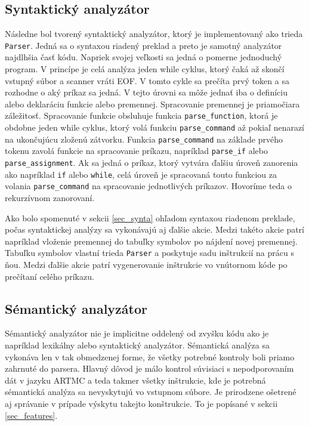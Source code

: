 \subsection{Syntaktický analyzátor}
Následne bol tvorený syntaktický analyzátor, ktorý je implementovaný ako trieda \texttt{Parser}. Jedná sa o syntaxou riadený preklad a preto je samotný analyzátor najdlhšia časť kódu. Napriek svojej veľkosti sa jedná o pomerne jednoduchý program. V princípe je celá analýza jeden while cyklus, ktorý čaká až skončí vstupný súbor a scanner vráti EOF. V tomto cykle sa prečíta prvý token a sa rozhodne o aký príkaz sa jedná. V tejto úrovni sa môže jednať iba o definíciu alebo deklaráciu funkcie alebo premennej. Spracovanie premennej je priamočiara záležitosť. Spracovanie funkcie obsluhuje funkcia \texttt{parse\_function}, ktorá je obdobne jeden while cyklus, ktorý volá funkciu \texttt{parse\_command} až pokiaľ nenarazí na ukončujúcu zloženú zátvorku. Funkcia \texttt{parse\_command}
na základe prvého tokenu zavolá funkcie na spracovanie príkazu, napríklad \texttt{parse\_if} alebo \texttt{parse\_assignment}. Ak sa jedná o príkaz, ktorý vytvára ďalšiu úroveň zanorenia ako napríklad \texttt{if} alebo \texttt{while}, celá úroveň je spracovaná touto funkciou za volania  \texttt{parse\_command} na spracovanie jednotlivých príkazov. Hovoríme teda o rekurzívnom zanorovaní.

Ako bolo spomenuté v sekcii \ref{sec_synta} ohľadom syntaxou riadenom preklade, počas syntaktickej analýzy sa vykonávajú aj ďalšie akcie. Medzi takéto akcie patrí napríklad vloženie premennej do tabuľky symbolov po nájdení novej premennej. Tabuľku symbolov vlastní trieda \texttt{Parser} a poskytuje sadu inštrukcií na prácu s ňou. Medzi ďalšie akcie patrí vygenerovanie inštrukcie vo vnútornom kóde po prečítaní celého príkazu. 

\subsection{Sémantický analyzátor}
Sémantický analyzátor nie je implicitne oddelený od zvyšku kódu ako je napríklad lexikálny alebo syntaktický analyzátor. Sémantická analýza sa vykonáva len v tak obmedzenej forme, že všetky potrebné kontroly boli priamo zahrnuté do parsera. Hlavný dôvod je málo kontrol súvisiaci s nepodporovaním dát v jazyku ARTMC a teda takmer všetky inštrukcie, kde je potrebná sémantická analýza sa nevyskytujú vo vstupnom súbore. Je prirodzene ošetrené aj správanie v prípade výskytu takejto konštrukcie. To je popísané v sekcii \ref{sec_features}.

